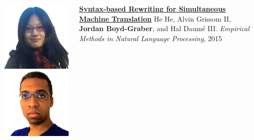 \documentclass[xcolor=dvipsnames]{beamer}
\begin{document}
\begin{frame}{}

  \begin{columns}
        \includegraphics[width=0.8\linewidth]{general_figures/hehe} \\
        \includegraphics[width=0.8\linewidth]{general_figures/alvin}

        \begin{block}{ {\bf \href{http://umiacs.umd.edu/~jbg//docs/2015_emnlp_rewrite.pdf}{Syntax-based Rewriting for Simultaneous Machine Translation}}}
He He, Alvin Grissom II, {\bf Jordan Boyd-Graber}, and Hal {Daum\'{e} III}.  \emph{Empirical Methods in Natural Language Processing}, 2015
        \end{block}


\end{columns}
\end{frame}
\end{document}
